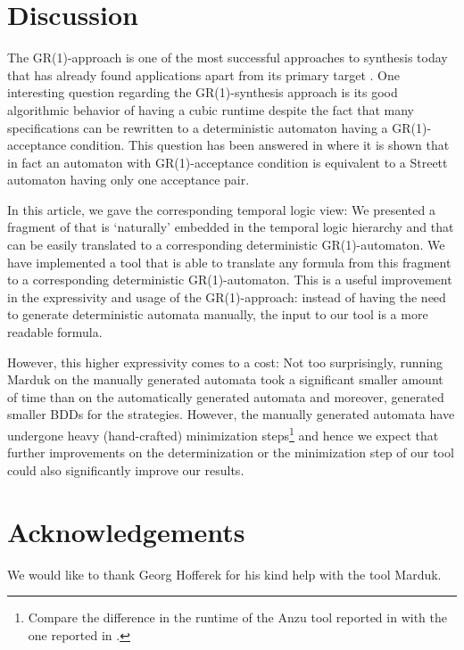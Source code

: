 \documentclass[submission,copyright,creativecommons]{eptcs}
\begin{document}
\section{Discussion}

The GR(1)-approach is one of the most successful approaches to \LTL{} synthesis today \cite{BGJP07,BGJP07a,JGWB07} that has already found applications apart from its primary target \cite{WoTM10}. One interesting question regarding the GR(1)-synthesis approach is its good algorithmic behavior of having a cubic runtime despite the fact that many specifications can be rewritten to a deterministic automaton having a GR(1)-acceptance condition. This question has been answered in \cite{BCGH10} where it is shown that in fact an automaton with GR(1)-acceptance condition is equivalent to a Streett automaton having only one acceptance pair. 

In this article, we gave the corresponding temporal logic view: We presented a fragment of \LTL{} that is `naturally' embedded in the temporal logic hierarchy and that can be easily translated to a corresponding deterministic GR(1)-automaton. We have implemented a tool that is able to translate any formula from this fragment to a corresponding deterministic GR(1)-automaton. This is a useful improvement in the expressivity and usage of the GR(1)-approach: instead of having the need to generate deterministic automata manually, the input to our tool is a more readable \LTL{} formula.

However, this higher expressivity comes to a cost: Not too surprisingly, running Marduk on the manually generated automata took a significant smaller amount of time than on the automatically generated automata and moreover, generated smaller BDDs for the strategies. However, the manually generated automata have undergone heavy (hand-crafted) minimization steps\footnote{Compare the difference in the runtime of the Anzu tool reported in \cite{BGJP07} with the one reported in \cite{BGJP07a}.} and hence we expect that further improvements on the determinization or the minimization step of our tool could also significantly improve our results.





\section{Acknowledgements}
We would like to thank Georg Hofferek for his kind help with the tool Marduk.

 

\end{document}
